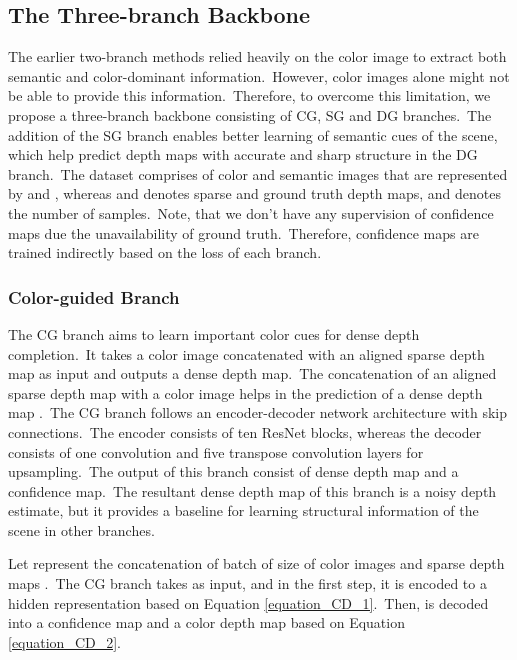 \documentclass{ieeeaccess}
\begin{document}
\subsection{The Three-branch Backbone}
The earlier two-branch methods \cite{hu2020PENet,yan2021rignet,zhao2021adaptive,liu2021fcfr} relied heavily on the color image to extract both semantic and color-dominant information.~However, color images alone might not be able to provide this information.~Therefore, to overcome this limitation, we propose a three-branch backbone consisting of CG, SG and DG branches.~The addition of the SG branch enables better learning of semantic cues of the scene, which help predict depth maps with accurate and sharp structure in the DG branch.~The dataset comprises of color and semantic images that are represented by  and , whereas  and  denotes sparse and ground truth depth maps, and  denotes the number of samples.~Note, that we don't have any supervision of confidence maps due the unavailability of ground truth.~Therefore, confidence maps are trained indirectly based on the  loss of each branch. 


\subsubsection{Color-guided Branch}
The CG branch aims to learn important color cues for dense depth completion.~It takes a color image concatenated with an aligned sparse depth map as input and outputs a dense depth map.~The concatenation of an aligned sparse depth map with a color image helps in the prediction of a dense depth map \cite{hu2020PENet}.~The CG branch follows an encoder-decoder network architecture with skip connections.~The encoder consists of ten ResNet \cite{he2016deep} blocks, whereas the decoder consists of one convolution and five transpose convolution layers for upsampling.~The output of this branch consist of dense depth map and a confidence map.~The resultant dense depth map of this branch is a noisy depth estimate, but it provides a baseline for learning structural information of the scene in other branches.

Let  represent the concatenation of batch of size  of color images  and sparse depth maps .~The CG branch takes  as input, and in the first step, it is encoded to a hidden representation  based on Equation \ref{equation_CD_1}.~Then,  is decoded into a confidence map   and a color depth map  based on Equation \ref{equation_CD_2}. 
\end{document}
